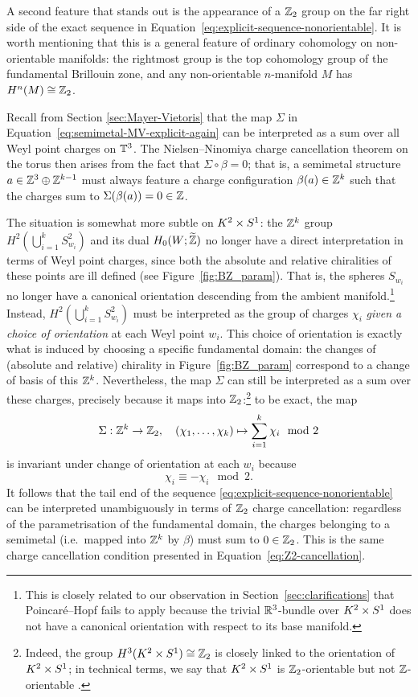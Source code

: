 A second feature that stands out is the appearance of a $\mathbb{Z}_2$ group on the far right side of the exact sequence in Equation~\eqref{eq:explicit-sequence-nonorientable}. It is worth mentioning that this is a general feature of ordinary cohomology on non-orientable manifolds: the rightmost group is the top cohomology group of the fundamental Brillouin zone, and any non-orientable $n$-manifold $M$ has $H^n(M)\cong\mathbb{Z}_2$.

Recall from Section \ref{sec:Mayer-Vietoris} that the map $\Sigma$ in Equation~\eqref{eq:semimetal-MV-explicit-again} can be interpreted as a sum over all Weyl point charges on $\mathbb{T}^3$. The Nielsen--Ninomiya charge cancellation theorem on the torus then arises from the fact that $\Sigma\circ\beta = 0$; that is, a semimetal structure $a\in\mathbb{Z}^3\oplus\mathbb{Z}^{k-1}$ must always feature a charge configuration $\beta(a)\in\mathbb{Z}^k$ such that the charges sum to $\Sigma(\beta(a)) = 0 \in \mathbb{Z}$.

The situation is somewhat more subtle on $K^2\times S^1$: the $\mathbb{Z}^k$ group $H^2\!\left(\bigcup_{i=1}^k S_{w_i}^2\right)$ and its dual $H_0(W;\widetilde{\mathbb{Z}})$ no longer have a direct interpretation in terms of Weyl point charges, since both the absolute and relative chiralities of these points are ill defined (see Figure~\ref{fig:BZ_param}). That is, the spheres $S_{w_i}$ no longer have a canonical orientation descending from the ambient manifold.\footnote{
	This is closely related to our observation in Section~\ref{sec:clarifications} that Poincaré--Hopf fails to apply because the trivial $\mathbb{R}^3$-bundle over $K^2\times S^1$ does not have a canonical orientation with respect to its base manifold.}
Instead, $H^2\!\left(\bigcup_{i=1}^k S_{w_i}^2\right)$ must be interpreted as the group of charges $\chi_i$ \emph{given a choice of orientation} at each Weyl point $w_i$. This choice of orientation is exactly what is induced by choosing a specific fundamental domain: the changes of (absolute and relative) chirality in Figure~\ref{fig:BZ_param} correspond to a change of basis of this $\mathbb{Z}^k$. Nevertheless, the map $\Sigma$ can still be interpreted as a sum over these charges, precisely because it maps into $\mathbb{Z}_2$:\footnote{
	Indeed, the group $H^3(K^2\times S^1)\cong\mathbb{Z}_2$ is closely linked to the orientation of $K^2\times S^1$; in technical terms, we say that $K^2\times S^1$ is $\mathbb{Z}_2$-orientable but not $\mathbb{Z}$-orientable \parencite[\S 3.3]{Hatcher_algebraic-topology}.}
to be exact, the map
\begin{equation}\label{eq:map-sigma}
	\Sigma: \mathbb{Z}^k\to\mathbb{Z}_2,\quad (\chi_1,\ldots,\chi_k) \mapsto \sum_{i=1}^{k}\chi_i \mod 2
\end{equation}
is invariant under change of orientation at each $w_i$ because
\begin{equation*}
	\chi_i \equiv -\chi_i \mod 2.
\end{equation*}
It follows that the tail end of the sequence \eqref{eq:explicit-sequence-nonorientable} can be interpreted unambiguously in terms of $\mathbb{Z}_2$ charge cancellation: regardless of the parametrisation of the fundamental domain, the charges belonging to a semimetal (i.e.\ mapped into $\mathbb{Z}^k$ by $\beta$) must sum to $0\in\mathbb{Z}_2$. This is the same charge cancellation condition presented in Equation~\eqref{eq:Z2-cancellation}.

